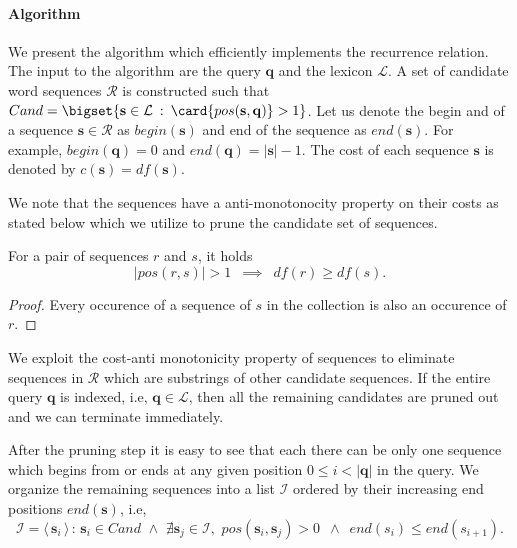\paragraph{Algorithm}

We present the algorithm which efficiently implements the recurrence relation. The input to the algorithm are the query $\mathbf{q}$ and the lexicon $\mathcal{L}$. A set of candidate word sequences $\mathcal{R}$ is constructed such that
$
  Cand = \bigset{ \mathbf{s} \in \mathcal{L} \::\: \card{pos(\mathbf{s}, \mathbf{q})} > 1}
$. Let us denote the begin and of a sequence $\mathbf{s} \in \mathcal{R}$ as $begin(\mathbf{s})$ and end of the sequence as $end(\mathbf{s})$. For example, $begin(\mathbf{q}) = 0$ and $end(\mathbf{q}) = |\mathbf{s}|-1$. The cost of each sequence $\mathbf{s}$ is denoted by $c(\mathbf{s}) = df(\mathbf{s})$.

We note that the sequences have a anti-monotonocity property on their costs as stated below which we utilize to prune the candidate set of sequences.
\begin{lemma}
For a pair of sequences $r$ and $s$, it holds
\begin{equation*}
  |pos(r,s)| > 1 \,\,\,\implies \,\,\,df(r) \geq df(s).
\end{equation*}
\end{lemma}
\begin{proof}{}
  Every occurence of a sequence of $s$ in the collection is also an occurence of $r$.
\end{proof}

We exploit the cost-anti monotonicity property of sequences to eliminate sequences in $\mathcal{R}$ which are substrings of other candidate sequences. If the entire query $\mathbf{q}$ is indexed, i.e, $\mathbf{q} \in \mathcal{L}$, then all the remaining candidates are pruned out and we can terminate immediately.

After the pruning step it is easy to see that each there can be only one sequence which begins from or ends at any given position $0 \leq i < |\mathbf{q}|$ in the query. We organize the remaining sequences into a list $\mathcal{I}$ ordered by their increasing end positions $end(\mathbf{s})$, i.e,
$$
  \mathcal{I} = \langle \, \mathbf{s}_i\,  \rangle\,: \, \mathbf{s}_i \in Cand \,\, \wedge\,\, \nexists \mathbf{s}_j \in \mathcal{I}, \,\, pos(\mathbf{s}_i, \mathbf{s}_j) > 0  \,\,\, \wedge \,\,\, end(s_i) \leq end(s_{i+1}).
$$ 

